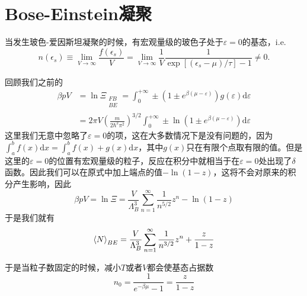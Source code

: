 \section{Bose-Einstein凝聚} %
\label{sec:Bose-Einstein凝聚}
\begin{definition}
    当发生玻色-爱因斯坦凝聚的时候，有宏观量级的玻色子处于$\varepsilon=0$的基态，i.e.\begin{equation}
        n\left(\epsilon_{s}\right) \equiv \lim _{V \rightarrow \infty} \frac{f\left(\epsilon_{s}\right)}{V}=\lim _{V \rightarrow \infty} \frac{1}{V} \frac{1}{\exp \left[\left(\epsilon_{s}-\mu\right) / \tau\right]-1} \neq 0.
    \end{equation}
\end{definition}
回顾我们之前的\begin{equation}
    \begin{aligned}
        \beta p V &=\ln \Xi_{\substack{FB\\BE}}= \int_{0}^{+\infty}\pm \left(1\pm e^{\beta(\mu-\varepsilon)}\right)  g(\varepsilon) \mathrm{d}\varepsilon\\
        &=2\pi V \left(\frac{m}{2\hbar^2 \pi^2}\right)^{3/2}\int_{0}^{+\infty} \pm \ln(1\pm e^{\beta(\mu-\varepsilon)}) \mathrm{d}\varepsilon
    \end{aligned}
\end{equation}
这里我们无意中忽略了$\varepsilon=0$的项，这在大多数情况下是没有问题的，因为$\displaystyle \int_{a}^{b}f(x) \mathrm{d} x =\int_{a}^{b}f(x)+g(x) \mathrm{d} x$，其中$g(x)$只在有限个点取有限的值。但是这里的$\varepsilon=0$的位置有宏观量级的粒子，反应在积分中就相当于在$\varepsilon=0$处出现了$\delta$函数。因此我们可以在原式中加上端点的值$-\ln(1-z)$，这将不会对原来的积分产生影响，因此\begin{equation}
    \beta p V=\ln \Xi=\frac{V}{\Lambda_B^3} \sum_{n=1}^{\infty}\frac{1}{n^{5/2}} z^{n}-\ln(1-z)
\end{equation}
于是我们就有\begin{equation}
    \braket{N}_{BE} = \frac{V}{\Lambda_B^3} \sum_{n=1}^{\infty}\frac{1}{n^{3/2}} z^{n}+\frac{z}{1-z} 
\end{equation}

于是当粒子数固定的时候，减小$T$或者$V$都会使基态占据数\begin{equation}
    n_0 = \frac{1}{e^{-\beta \mu}-1} = \frac{z}{1-z}
\end{equation}

